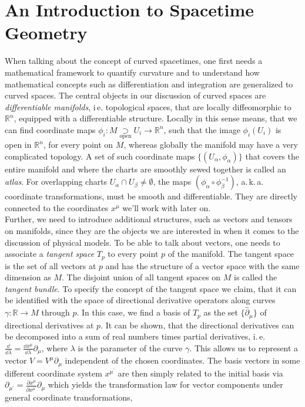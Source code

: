 \section{An Introduction to Spacetime Geometry}
 When talking about the concept of curved spacetimes, one first needs a mathematical framework to quantify curvature and to understand how mathematical concepts such as differentiation and integration are generalized to curved spaces. 
 The central objects in our discussion of curved spaces are \textit{differentiable manifolds}, i\,e. topological spaces, that are  locally diffeomorphic to $\mathbb{R}^n$, equipped with a differentiable structure. Locally in this sense means, that we can find coordinate maps $\phi_i: M \underset{\mathrm{open}}{\supset} U_i \rightarrow \mathbb{R}^n$, such that the image $\phi_i(U_i)$ is open in  $\mathbb{R}^n$, for every point on $M$, whereas globally the manifold may have a very complicated topology. A set of such coordinate maps $\{(U_{\alpha}, \phi_{\alpha})\}$ that covers the entire manifold and where the charts are smoothly sewed together is called an \textit{atlas}. For overlapping charts $U_{\alpha}\cap U_{\beta} \neq \emptyset$, the maps $(\phi_{\alpha} \circ \phi_{\beta}^{-1})$, a.\,k.\,a. coordinate transformations, must be smooth and differentiable. They are directly connected to the coordinates $x^{\mu}$ we'll work with later on. \\
Further, we need to introduce additional structures, such as vectors and tensors on manifolds, since they are the objects we are interested in when it comes to the discussion of physical models. To be able to talk about vectors, one needs to associate  a \textit{tangent space} $T_p$ to every point $p$ of the manifold. The tangent space is the set of all vectors at  $p$ and  has the structure of a vector space with the same dimension as $M$. The disjoint union of all tangent spaces on $M$ is called the \textit{tangent bundle}. To specify the concept of the tangent space we claim, that it can be identified with the space of directional derivative operators along curves $\gamma: \mathbb{R} \rightarrow M$  through $p$. In this case, we find a basis of $T_p$ as the set $\{\hat{\partial}_{\mu}\}$ of directional derivatives at $p$. It can be shown, that the directional derivatives can be decomposed into a sum of real numbers times partial derivatives, i.\,e. $\frac{\dd}{\dd \lambda} = \frac{\dd x^{\mu}}{\dd \lambda}\partial_{\mu}$, where $\lambda$ is the parameter of the curve $\gamma$. This allows us to represent a vector $V=V^{\mu}\partial_{\mu}$ independent of the chosen coordinates. The basis vectors in some different coordinate system $x^{\mu^{\prime}}$ are then simply related to the initial basis via $\partial_{\mu^{\prime}}=\frac{\partial x^{\mu}}{\partial x^{\mu^{\prime}}} \partial_{\mu}$ which yields the transformation law for vector components under general coordinate transformations,
